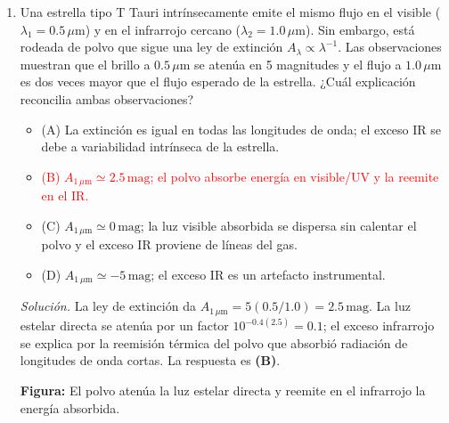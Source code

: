 \documentclass[11pt]{article}
\begin{document}
\begin{enumerate}
    \item Una estrella tipo T Tauri intrínsecamente emite el mismo flujo en el visible ($\lambda_1=0.5\,\mu\mathrm{m}$) y en el infrarrojo cercano ($\lambda_2=1.0\,\mu\mathrm{m}$). Sin embargo, está rodeada de polvo que sigue una ley de extinción $A_\lambda\propto\lambda^{-1}$. Las observaciones muestran que el brillo a $0.5\,\mu\mathrm{m}$ se atenúa en 5 magnitudes y el flujo a $1.0\,\mu\mathrm{m}$ es dos veces mayor que el flujo esperado de la estrella. ¿Cuál explicación reconcilia ambas observaciones?
    \begin{itemize}
        \item (A) La extinción es igual en todas las longitudes de onda; el exceso IR se debe a variabilidad intrínseca de la estrella.
        \item \textcolor{red}{(B) $A_{1\,\mu\mathrm{m}}\simeq2.5\,\mathrm{mag}$; el polvo absorbe energía en visible/UV y la reemite en el IR.}
        \item (C) $A_{1\,\mu\mathrm{m}}\simeq0\,\mathrm{mag}$; la luz visible absorbida se dispersa sin calentar el polvo y el exceso IR proviene de líneas del gas.
        \item (D) $A_{1\,\mu\mathrm{m}}\simeq-5\,\mathrm{mag}$; el exceso IR es un artefacto instrumental.
    \end{itemize}
    \textit{Solución.} La ley de extinción da $A_{1\,\mu\mathrm{m}}=5(0.5/1.0)=2.5\,\mathrm{mag}$. La luz estelar directa se atenúa por un factor $10^{-0.4(2.5)}=0.1$; el exceso infrarrojo se explica por la reemisión térmica del polvo que absorbió radiación de longitudes de onda cortas. La respuesta es \textbf{(B)}. \parencite[Secs. 12.2--12.3 y 14.8.7, pp. 375--383, 469--470]{chaparro2026}
    \begin{center}
    \par{\small\textbf{Figura:} El polvo atenúa la luz estelar directa y reemite en el infrarrojo la energía absorbida.}
    \end{center}


\end{enumerate}
\end{document}
